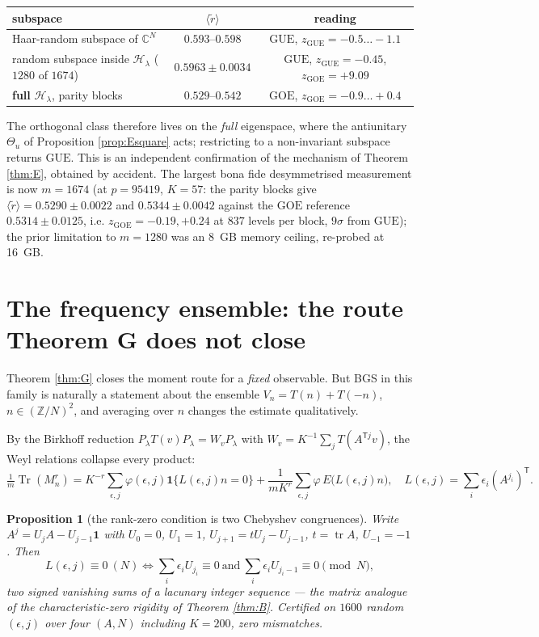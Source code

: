 \documentclass[11pt,reqno]{amsart}
\newtheorem{proposition}[theorem]{Proposition}
\theoremstyle{definition}
\DeclareMathOperator{\Tr}{Tr}
\DeclareMathOperator{\tr}{tr}
\newcommand{\ZZ}{\mathbb{Z}}
\newcommand{\CC}{\mathbb{C}}
\newcommand{\HH}{\mathcal{H}}
\newcommand{\GUE}{\mathrm{GUE}}
\newcommand{\GOE}{\mathrm{GOE}}
\begin{document}
\begin{center}\footnotesize
\begin{tabular}{@{}lcc@{}}
\toprule
subspace & $\langle\tilde r\rangle$ & reading\\
\midrule
Haar-random subspace of $\CC^N$ & $0.593$--$0.598$ & $\GUE$, $z_{\GUE}=-0.5\dots-1.1$\\
random subspace inside $\HH_\lambda$ ($1280$ of $1674$) & $0.5963\pm0.0034$
 & $\GUE$, $z_{\GUE}=-0.45$, $z_{\GOE}=+9.09$\\
\textbf{full} $\HH_\lambda$, parity blocks & $0.529$--$0.542$
 & $\boldsymbol{\GOE}$, $z_{\GOE}=-0.9\dots+0.4$\\
\bottomrule
\end{tabular}
\end{center}

\noindent
The orthogonal class therefore lives on the \emph{full} eigenspace, where the
antiunitary $\Theta_u$ of Proposition \ref{prop:Esquare} acts; restricting to a
non-invariant subspace returns $\GUE$. This is an independent confirmation of the
mechanism of Theorem \ref{thm:E}, obtained by accident. The largest bona fide
desymmetrised measurement is now $m=1674$ (at $p=95419$, $K=57$: the parity
blocks give $\langle\tilde r\rangle=0.5290\pm0.0022$ and
$0.5344\pm0.0042$ against the $\GOE$ reference $0.5314\pm0.0125$, i.e.
$z_{\GOE}=-0.19,+0.24$ at $837$ levels per block, $9\sigma$ from $\GUE$);
the prior limitation to $m=1280$ was an 8~GB memory ceiling, re-probed at
16~GB.


\section{The frequency ensemble: the route Theorem G does not close}
\label{sec:ensemble}

Theorem \ref{thm:G} closes the moment route for a \emph{fixed} observable. But BGS
in this family is naturally a statement about the ensemble
$V_n=T(n)+T(-n)$, $n\in(\ZZ/N)^2$, and averaging over $n$ changes the estimate
qualitatively.

By the Birkhoff reduction $P_\lambda T(v)P_\lambda=W_vP_\lambda$ with
$W_v=K^{-1}\sum_jT(A^{\mathsf Tj}v)$, the Weyl relations collapse every product:
\[
  \tfrac1m\Tr(M_n^r)=K^{-r}\!\!\sum_{\epsilon,j}\!\varphi(\epsilon,j)
   \mathbf 1\{L(\epsilon,j)n=0\}
  +\frac1{mK^r}\sum_{\epsilon,j}\varphi\,E\bigl(L(\epsilon,j)n\bigr),
  \quad L(\epsilon,j)=\sum_i\epsilon_i(A^{j_i})^{\mathsf T}.
\]

\begin{proposition}[the rank-zero condition is two Chebyshev congruences]
Write $A^j=U_jA-U_{j-1}\mathbf1$ with $U_0=0$, $U_1=1$, $U_{j+1}=tU_j-U_{j-1}$,
$t=\tr A$, $U_{-1}=-1$. Then
\[
  L(\epsilon,j)\equiv0\ (N)\iff
  \sum_i\epsilon_iU_{j_i}\equiv0\ \text{and}\ \sum_i\epsilon_iU_{j_i-1}\equiv0
  \pmod N,
\]
two signed vanishing sums of a lacunary integer sequence --- the matrix analogue of
the characteristic-zero rigidity of Theorem \ref{thm:B}. Certified on $1600$
random $(\epsilon,j)$ over four $(A,N)$ including $K=200$, zero mismatches.
\end{proposition}
\end{document}
